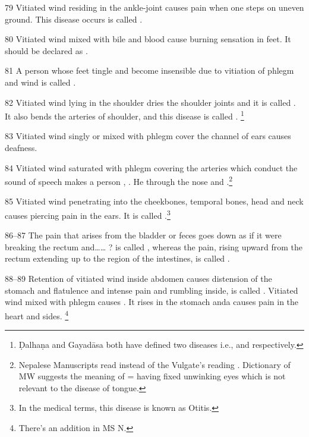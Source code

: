 \begin{translation}
\item[79] Vitiated wind residing in the ankle-joint causes pain when one steps on uneven ground. This disease occurs is called .

\item[80] Vitiated wind mixed with bile and blood cause burning sensation in feet. 
It should be declared as .

\item[81] A person whose feet tingle and become insensible due to vitiation of phlegm and wind is called .

\item[82] Vitiated wind lying in the shoulder dries the shoulder joints and it is called . It also bends the arteries of shoulder, and this disease is called . \footnote{Ḍalhaṇa and Gayadāsa both have defined two diseases i.e.,  and  respectively.}

\item[83] Vitiated wind singly or mixed with phlegm cover the channel of ears causes deafness.

\item[84] Vitiated wind saturated with phlegm covering the arteries which 
conduct the sound of speech makes a person , 
. He  through the nose and 
.\footnote{Nepalese Manuscripts read  
instead of the Vulgate’s reading . Dictionary of MW suggests the 
meaning of  = having fixed unwinking eyes which is not relevant to 
the disease of tongue.}

\item[85] Vitiated wind penetrating into the cheekbones, temporal bones, head 
and neck causes piercing pain in the ears. It is called 
.\footnote{In the medical terms, this disease is known 
as Otitis.}

\item[86--87] The pain that arises from the bladder or feces goes down as if it were breaking the rectum and…… ? is called , whereas the pain, rising upward from the rectum extending up to the region of the intestines, is called .

\item[88--89] Retention of vitiated wind inside abdomen causes distension of the 
stomach and flatulence and intense pain and rumbling inside, is called 
. Vitiated wind mixed with phlegm causes 
. It rises in the stomach anda causes pain in the heart and 
sides. \footnote{There’s an addition in MS N. }


\end{translation}
